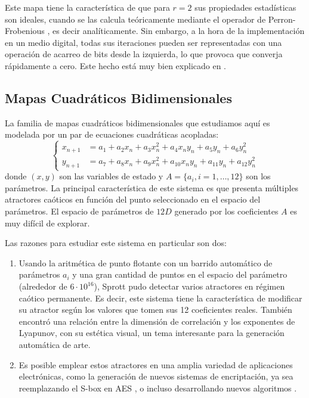 Este mapa tiene la característica de que para $r = 2$ sus propiedades estadísticas son ideales, cuando se las calcula teóricamente mediante el operador de Perron-Frobenious \cite{Lasota1994, Lasota1973}, es decir analíticamente.
Sin embargo, a la hora de la implementación en un medio digital, todas sus iteraciones pueden ser representadas con una operación de acarreo de bits desde la izquierda, lo que provoca que converja rápidamente a cero.
Este hecho está muy bien explicado en \cite{Li2004}.

\subsection{Mapas Cuadráticos Bidimensionales}
\label{ssecQMaps}

La familia de mapas cuadráticos bidimensionales que estudiamos aquí es modelada por un par de ecuaciones cuadráticas acopladas:
%
\begin{equation}\label{eq:mapaSprott}
\left\{\begin{aligned}
x_{n+1}&=a_1+a_2 x_n+a_3 x_n^2+a_4 x_n y_n+a_5 y_n+a_6 y_n^2\\
y_{n+1}&=a_7+a_8 x_n+a_9 x_n^2+a_{10} x_n y_n+a_{11} y_n+a_{12} y_n^2
\end{aligned}
\right.
\end{equation}
%
donde $(x, y)$ son las variables de estado y $A = \{a_i, i = 1, \dots, 12 \}$ son los parámetros.
La principal característica de este sistema es que presenta múltiples atractores caóticos en función del punto seleccionado en el espacio del parámetros.
El espacio de parámetros de $12D$ generado por los coeficientes $A$ es muy difícil de explorar.

Las razones para estudiar este sistema en particular son dos:
%
\begin{enumerate}
	\item Usando la aritmética de punto flotante con un barrido automático de parámetros $a_i$ y una gran cantidad de puntos en el espacio del parámetro (alrededor de $6\cdot10 ^ {16}$), Sprott pudo detectar varios atractores en régimen caótico permanente.
	Es decir, este sistema tiene la característica de modificar su atractor según los valores que tomen sus 12 coeficientes reales.
	También encontró una relación entre la dimensión de correlación y los exponentes de Lyapunov, con su estética visual, un tema interesante para la generación automática de arte.
	\item Es posible emplear estos atractores en una amplia variedad de aplicaciones electrónicas, como la generación de nuevos sistemas de encriptación, ya sea reemplazando el S-box en AES \cite{Ahmad2013, Hussain2013}, o incluso desarrollando nuevos algoritmos \cite{Machado2004, Smaoui2009}.
\end{enumerate}

